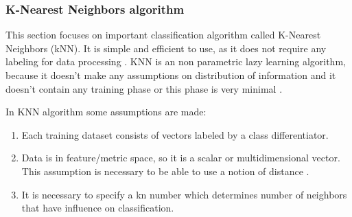 	\subsubsection{K-Nearest Neighbors algorithm}
	This section focuses on important classification algorithm called K-Nearest Neighbors (kNN). It is simple and efficient to use, as it does not require any labeling for data processing \cite{knn}. KNN is an non parametric lazy learning algorithm, because it doesn't make any assumptions on distribution of information and it doesn't contain any training phase or this phase is very minimal \cite{knn2}.  
	
	In KNN algorithm some assumptions are made:
	\begin{enumerate}
		\item Each training dataset consists of vectors labeled by a class differentiator. 
		\item Data is in feature/metric space, so it is a scalar or multidimensional vector. This assumption is necessary to be able to use a notion of distance \cite{knn2}.
		\item It is necessary to specify a kn number which determines number of neighbors that have influence on classification. 
	\end{enumerate}
	
